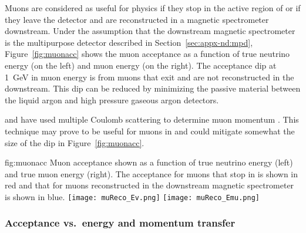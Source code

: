 \label{sec:appx-nd:muacc}

Muons are considered as useful for physics if they stop in the active region of  or if they leave the  detector and are reconstructed in a magnetic spectrometer downstream.  Under the assumption that the downstream magnetic spectrometer is the multipurpose detector described in Section~\ref{sec:appx-nd:mpd}, Figure~\ref{fig:muonacc}  shows the muon acceptance as a function of true neutrino energy (on the left) and muon energy (on the right). The acceptance dip at \SI{1}{GeV} in muon energy is from muons that exit  and are not reconstructed in the  downstream. This dip can be reduced by minimizing the passive material between the liquid argon and high pressure gaseous argon detectors.

 and  have used multiple Coulomb scattering to determine muon momentum \cite{Abratenko:2017nki}.  
This technique may prove to be useful for muons in  and could  mitigate somewhat the size of the dip in Figure~\ref{fig:muonacc}.   

\begin{dunefigure}{fig:muonacc}
{Muon acceptance shown as a function of true neutrino energy (left) and true muon energy (right).  The acceptance for muons that stop in  is shown in red and that for muons reconstructed in the downstream magnetic spectrometer is shown in blue.}
      \texttt{[image: muReco\_Ev.png]}
      \texttt{[image: muReco\_Emu.png]}
\end{dunefigure}

\subsubsection{Acceptance vs.\ energy and momentum transfer}

